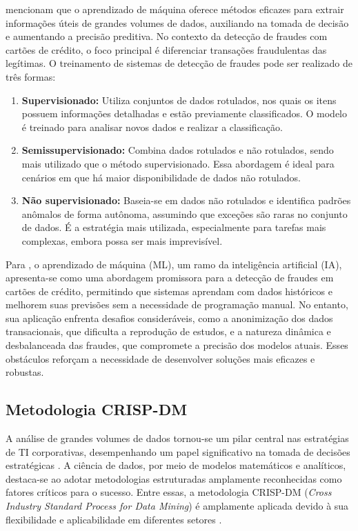 \documentclass[12pt,a4paper]{article}
\begin{document}
\cite{gupta2020} mencionam que o aprendizado de máquina oferece métodos eficazes para extrair informações úteis de grandes volumes de dados, auxiliando na tomada de decisão e aumentando a precisão preditiva. No contexto da detecção de fraudes com cartões de crédito, o foco principal é diferenciar transações fraudulentas das legítimas. O treinamento de sistemas de detecção de fraudes pode ser realizado de três formas:
\begin{enumerate}
    \item \textbf{Supervisionado:} Utiliza conjuntos de dados rotulados, nos quais os itens possuem informações detalhadas e estão previamente classificados. O modelo é treinado para analisar novos dados e realizar a classificação.
    \item \textbf{Semissupervisionado:} Combina dados rotulados e não rotulados, sendo mais utilizado que o método supervisionado. Essa abordagem é ideal para cenários em que há maior disponibilidade de dados não rotulados.
    \item \textbf{Não supervisionado:} Baseia-se em dados não rotulados e identifica padrões anômalos de forma autônoma, assumindo que exceções são raras no conjunto de dados. É a estratégia mais utilizada, especialmente para tarefas mais complexas, embora possa ser mais imprevisível.
\end{enumerate}

Para \cite{bhati2024}, o aprendizado de máquina (ML), um ramo da inteligência artificial (IA), apresenta-se como uma abordagem promissora para a detecção de fraudes em cartões de crédito, permitindo que sistemas aprendam com dados históricos e melhorem suas previsões sem a necessidade de programação manual. No entanto, sua aplicação enfrenta desafios consideráveis, como a anonimização dos dados transacionais, que dificulta a reprodução de estudos, e a natureza dinâmica e desbalanceada das fraudes, que compromete a precisão dos modelos atuais. Esses obstáculos reforçam a necessidade de desenvolver soluções mais eficazes e robustas.

\subsection{Metodologia CRISP-DM}

A análise de grandes volumes de dados tornou-se um pilar central nas estratégias de TI corporativas, desempenhando um papel significativo na tomada de decisões estratégicas \cite{schroer2021}. A ciência de dados, por meio de modelos matemáticos e analíticos, destaca-se ao adotar metodologias estruturadas amplamente reconhecidas como fatores críticos para o sucesso. Entre essas, a metodologia CRISP-DM (\textit{Cross Industry Standard Process for Data Mining}) é amplamente aplicada devido à sua flexibilidade e aplicabilidade em diferentes setores \cite{silva2023}.
\end{document}
